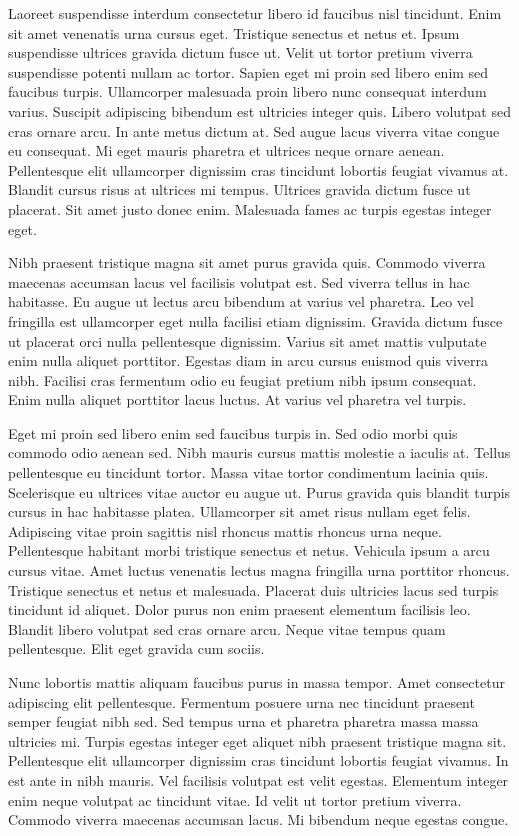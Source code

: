 \documentclass[11pt,a4paper]{article}
\begin{document}
Laoreet suspendisse interdum consectetur libero id faucibus nisl tincidunt. Enim sit amet venenatis urna cursus eget. Tristique senectus et netus et. Ipsum suspendisse ultrices gravida dictum fusce ut. Velit ut tortor pretium viverra suspendisse potenti nullam ac tortor. Sapien eget mi proin sed libero enim sed faucibus turpis. Ullamcorper malesuada proin libero nunc consequat interdum varius. Suscipit adipiscing bibendum est ultricies integer quis. Libero volutpat sed cras ornare arcu. In ante metus dictum at. Sed augue lacus viverra vitae congue eu consequat. Mi eget mauris pharetra et ultrices neque ornare aenean. Pellentesque elit ullamcorper dignissim cras tincidunt lobortis feugiat vivamus at. Blandit cursus risus at ultrices mi tempus. Ultrices gravida dictum fusce ut placerat. Sit amet justo donec enim. Malesuada fames ac turpis egestas integer eget.

Nibh praesent tristique magna sit amet purus gravida quis. Commodo viverra maecenas accumsan lacus vel facilisis volutpat est. Sed viverra tellus in hac habitasse. Eu augue ut lectus arcu bibendum at varius vel pharetra. Leo vel fringilla est ullamcorper eget nulla facilisi etiam dignissim. Gravida dictum fusce ut placerat orci nulla pellentesque dignissim. Varius sit amet mattis vulputate enim nulla aliquet porttitor. Egestas diam in arcu cursus euismod quis viverra nibh. Facilisi cras fermentum odio eu feugiat pretium nibh ipsum consequat. Enim nulla aliquet porttitor lacus luctus. At varius vel pharetra vel turpis.

Eget mi proin sed libero enim sed faucibus turpis in. Sed odio morbi quis commodo odio aenean sed. Nibh mauris cursus mattis molestie a iaculis at. Tellus pellentesque eu tincidunt tortor. Massa vitae tortor condimentum lacinia quis. Scelerisque eu ultrices vitae auctor eu augue ut. Purus gravida quis blandit turpis cursus in hac habitasse platea. Ullamcorper sit amet risus nullam eget felis. Adipiscing vitae proin sagittis nisl rhoncus mattis rhoncus urna neque. Pellentesque habitant morbi tristique senectus et netus. Vehicula ipsum a arcu cursus vitae. Amet luctus venenatis lectus magna fringilla urna porttitor rhoncus. Tristique senectus et netus et malesuada. Placerat duis ultricies lacus sed turpis tincidunt id aliquet. Dolor purus non enim praesent elementum facilisis leo. Blandit libero volutpat sed cras ornare arcu. Neque vitae tempus quam pellentesque. Elit eget gravida cum sociis.

Nunc lobortis mattis aliquam faucibus purus in massa tempor. Amet consectetur adipiscing elit pellentesque. Fermentum posuere urna nec tincidunt praesent semper feugiat nibh sed. Sed tempus urna et pharetra pharetra massa massa ultricies mi. Turpis egestas integer eget aliquet nibh praesent tristique magna sit. Pellentesque elit ullamcorper dignissim cras tincidunt lobortis feugiat vivamus. In est ante in nibh mauris. Vel facilisis volutpat est velit egestas. Elementum integer enim neque volutpat ac tincidunt vitae. Id velit ut tortor pretium viverra. Commodo viverra maecenas accumsan lacus. Mi bibendum neque egestas congue.
\end{document}
